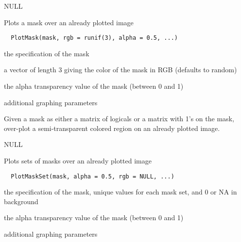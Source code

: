 \documentclass[a4paper]{book}
\begin{document}
%
\begin{Value}
NULL
\end{Value}
%
\begin{Description}\relax
Plots a mask over an already plotted image
\end{Description}
%
\begin{Usage}
\begin{verbatim}
  PlotMask(mask, rgb = runif(3), alpha = 0.5, ...)
\end{verbatim}
\end{Usage}
%
\begin{Arguments}
\begin{ldescription}
\item[\code{mask}] the specification of the mask

\item[\code{rgb}] a vector of length 3 giving the color of the
mask in RGB (defaults to random)

\item[\code{alpha}] the alpha transparency value of the mask
(between 0 and 1)

\item[\code{...}] additional graphing parameters
\end{ldescription}
\end{Arguments}
%
\begin{Details}\relax
Given a mask as either a matrix of logicals or a matrix
with 1's on the mask, over-plot a semi-transparent
colored region on an already plotted image.
\end{Details}
%
\begin{Value}
NULL
\end{Value}
%
\begin{Description}\relax
Plots sets of masks over an already plotted image
\end{Description}
%
\begin{Usage}
\begin{verbatim}
  PlotMaskSet(mask, alpha = 0.5, rgb = NULL, ...)
\end{verbatim}
\end{Usage}
%
\begin{Arguments}
\begin{ldescription}
\item[\code{mask}] the specification of the mask, unique values
for each mask set, and 0 or NA in background

\item[\code{alpha}] the alpha transparency value of the mask
(between 0 and 1)

\item[\code{...}] additional graphing parameters
\end{ldescription}
\end{Arguments}
\end{document}
